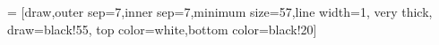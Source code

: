  = [draw,outer sep=7,inner sep=7,minimum size=57,line width=1, very thick, draw=black!55, top color=white,bottom color=black!20]